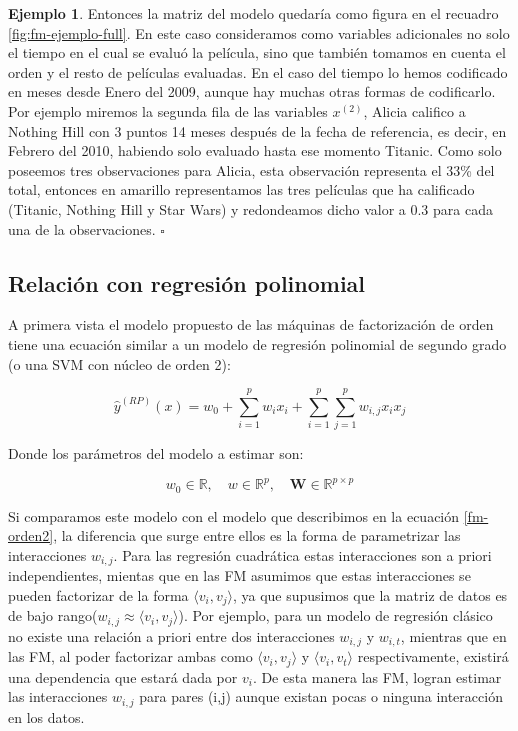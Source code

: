 \documentclass[hidelinks,12pt,a4paper]{book}
\providecommand{\prodint}[1]{\langle#1\rangle}
\theoremstyle{plain}
\theoremstyle{definition}
\newtheorem{ejemplo}{{\textbf{Ejemplo}}}[chapter]
\begin{document}
\begin{ejemplo}
Entonces la matriz del modelo quedaría como figura en el recuadro \ref{fig:fm-ejemplo-full}. En este caso consideramos como variables adicionales no solo el tiempo en el cual se evaluó la película, sino que también tomamos en cuenta el orden y el resto de películas evaluadas. En el caso del tiempo lo hemos codificado en meses desde Enero del 2009, aunque hay muchas otras formas de codificarlo. Por ejemplo miremos la segunda fila de las variables $x^{(2)}$, Alicia califico a Nothing Hill con 3 puntos 14 meses después de la fecha de referencia, es decir, en Febrero del 2010, habiendo solo evaluado hasta ese momento Titanic. Como solo poseemos tres observaciones para Alicia, esta observación representa el 33\% del total, entonces en amarillo representamos las tres películas que ha calificado (Titanic, Nothing Hill y Star Wars) y redondeamos dicho valor a 0.3 para cada una de la observaciones.
\hfill$\square$
\end{ejemplo}

\subsection{Relación con regresión polinomial}

A primera vista el modelo propuesto de las máquinas de factorización de orden tiene una ecuación similar a un modelo de regresión polinomial de segundo grado (o una SVM con núcleo de orden 2):

\begin{equation}
\hat{y}^{(RP)}(x) = w_0 + \sum_{i=1}^{p} w_i x_i + \sum_{i=1}^{p} \sum_{j=1}^p w_{i,j} x_i x_j
\end{equation}

Donde los parámetros del modelo a estimar son:

\begin{equation*}
w_0 \in \mathbb{R}, \quad w \in \mathbb{R}^p, \quad \textbf{W} \in \mathbb{R}^{p \times p}
\end{equation*}

Si comparamos este modelo con el modelo que describimos en la ecuación \eqref{fm-orden2}, la diferencia que surge entre ellos es la forma de parametrizar las interacciones $w_{i,j}$. Para las regresión cuadrática estas interacciones son a priori independientes, mientas que en las FM asumimos que estas interacciones se pueden factorizar de la forma $\prodint{v_i,v_j}$, ya que supusimos que la matriz de datos es de bajo rango($w_{i,j}\approx \prodint{v_i,v_j}$). Por ejemplo, para un modelo de regresión clásico no existe una relación a priori entre dos interacciones $w_{i,j}$ y $w_{i,t}$, mientras que en las FM, al poder factorizar ambas como $\prodint{v_i,v_j}$ y $\prodint{v_i,v_t}$ respectivamente, existirá una dependencia que estará dada por $v_i$. De esta manera las FM, logran estimar las interacciones $w_{i,j}$ para pares (i,j) aunque existan pocas o ninguna interacción en los datos\cite{rendle2012factorization}. 
\end{document}
